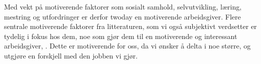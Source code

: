Med vekt på motiverende faktorer som sosialt samhold, selvutvikling, læring, mestring og utfordringer er derfor
twoday en motiverende arbeidsgiver. Flere sentrale motiverende faktorer fra litteraturen, som vi også subjektivt verdsetter
er tydelig i fokus hos dem, noe som gjør dem til en motiverende og interessant arbeidsgiver, \parencite["Graduateprogrammet"]{Twoday.no}. Dette er motiverende for oss, da vi ønsker å delta i noe
større, og utgjøre en forskjell med den jobben vi gjør.



